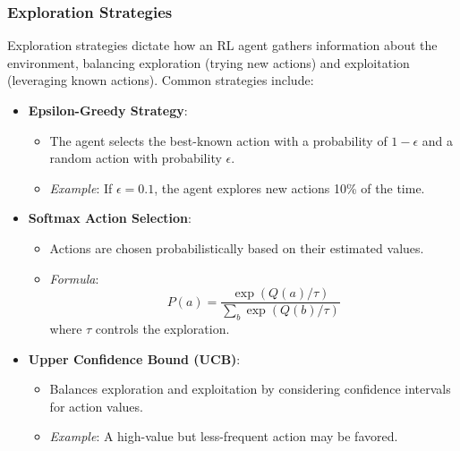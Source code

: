 \documentclass[aspectratio=169]{beamer}
\begin{document}
\begin{frame}[fragile]
    \frametitle{Exploration Strategies}
    Exploration strategies dictate how an RL agent gathers information about the environment, balancing exploration (trying new actions) and exploitation (leveraging known actions). Common strategies include:
    \begin{itemize}
        \item \textbf{Epsilon-Greedy Strategy}:
        \begin{itemize}
            \item The agent selects the best-known action with a probability of \(1 - \epsilon\) and a random action with probability \(\epsilon\).
            \item \textit{Example}: If \(\epsilon = 0.1\), the agent explores new actions 10\% of the time.
        \end{itemize}
        
        \item \textbf{Softmax Action Selection}:
        \begin{itemize}
            \item Actions are chosen probabilistically based on their estimated values.
            \item \textit{Formula}: 
            \begin{equation}
                P(a) = \frac{\exp(Q(a)/\tau)}{\sum_{b} \exp(Q(b)/\tau)} 
            \end{equation}
            where \(\tau\) controls the exploration.
        \end{itemize}
        
        \item \textbf{Upper Confidence Bound (UCB)}:
        \begin{itemize}
            \item Balances exploration and exploitation by considering confidence intervals for action values.
            \item \textit{Example}: A high-value but less-frequent action may be favored.
        \end{itemize}
    \end{itemize}
\end{frame}
\end{document}
